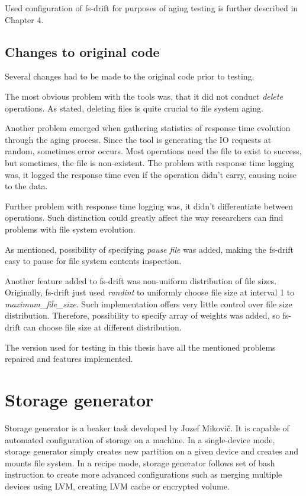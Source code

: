 \documentclass[
  color, %
  table, %
  lof,   %
  lot,   %
]{fithesis3}
\begin{document}
Used configuration of fs-drift for purposes of aging testing is further described in Chapter 4.

\subsection{Changes to original code}
Several changes had to be made to the original code prior to testing.

The most obvious problem with the tools was, that it did not conduct \textit{delete} operations. As stated, deleting files is quite crucial to file system aging.

Another problem emerged when gathering statistics of response time evolution through the aging process. Since the tool is generating the IO requests at random, sometimes error occurs. Most operations need the file to exist to success, but sometimes, the file is non-existent. The problem with response time logging was, it logged the response time even if the operation didn't carry, causing noise to the data.

Further problem with response time logging was, it didn't differentiate between operations. Such distinction could greatly affect the way researchers can find problems with file system evolution.

As mentioned, possibility of specifying \textit{pause file} was added, making the fs-drift easy to pause for file system contents inspection.

Another feature added to fs-drift was non-uniform distribution of file sizes. Originally, fs-drift just used \textit{randint} to uniformly choose file size at interval 1 to \textit{maximum\_file\_size}. Such implementation offers very little control over file size distribution. Therefore, possibility to specify array of weights was added, so fs-drift can choose file size at different distribution.

The version used for testing in this thesis have all the mentioned problems repaired and features implemented.

\section{Storage generator}
Storage generator is a beaker task developed by Jozef Mikovič. It is capable of automated configuration of storage on a machine. In a single-device mode, storage generator simply creates new partition on a given device and creates and mounts file system. In a recipe mode, storage generator follows set of bash instruction to create more advanced configurations such as merging multiple devices using LVM, creating LVM cache or encrypted volume.
\end{document}
